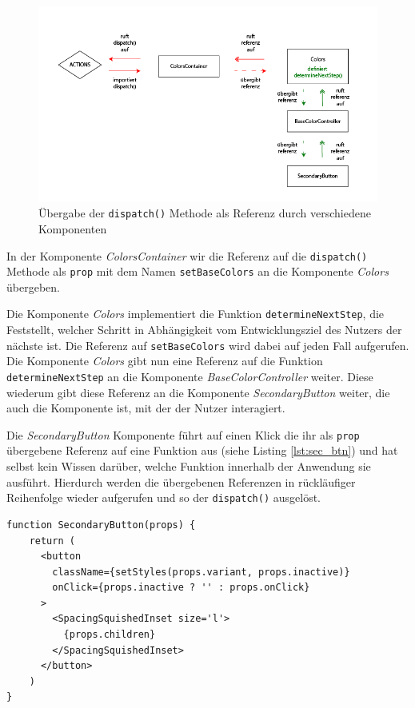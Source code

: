 \begin{figure}[h]
    \centering
    \includegraphics[width=1\textwidth]{images/redux_store_flow.png}
    \caption{Übergabe der \texttt{dispatch()} Methode als Referenz durch verschiedene Komponenten}
    \label{fig:redux_flow}
\end{figure}

In der Komponente \textit{ColorsContainer} wir die Referenz auf die \verb|dispatch()| Methode als \verb|prop| mit dem Namen \verb|setBaseColors| an die Komponente \textit{Colors} übergeben.

Die Komponente \textit{Colors} implementiert die Funktion \verb|determineNextStep|, die Feststellt, welcher Schritt in Abhängigkeit vom Entwicklungsziel des Nutzers der nächste ist. Die Referenz auf \verb|setBaseColors| wird dabei auf jeden Fall aufgerufen. Die Komponente \textit{Colors} gibt nun eine Referenz auf die Funktion \verb|determineNextStep| an die Komponente \textit{BaseColorController} weiter. Diese wiederum gibt diese Referenz an die Komponente \textit{SecondaryButton} weiter, die auch die Komponente ist, mit der der Nutzer interagiert.

Die \textit{SecondaryButton} Komponente führt auf einen Klick die ihr als \verb|prop| übergebene Referenz auf eine Funktion aus (siehe Listing \ref{lst:sec_btn}) und hat selbst kein Wissen darüber, welche Funktion innerhalb der Anwendung sie ausführt. Hierdurch werden die übergebenen Referenzen in rückläufiger Reihenfolge wieder aufgerufen und so der \verb|dispatch()| ausgelöst.

\begin{lstlisting}[caption={Aufruf der übergebenen Funktion in der Komponente \textit{SecondaryButton}}, label=lst:sec_btn]
  function SecondaryButton(props) {
    return (
      <button
        className={setStyles(props.variant, props.inactive)}
        onClick={props.inactive ? '' : props.onClick}
      >
        <SpacingSquishedInset size='l'>
          {props.children}
        </SpacingSquishedInset>
      </button>
    )
}
\end{lstlisting}


